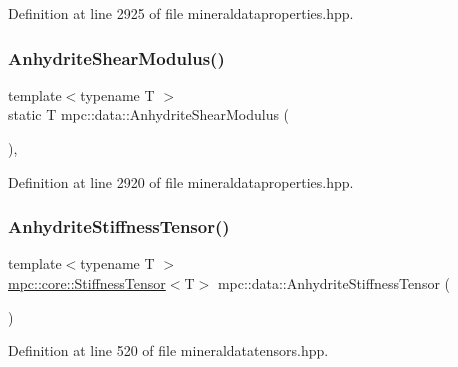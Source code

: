 Definition at line 2925 of file mineraldataproperties.\+hpp.

\mbox{\label{namespacempc_1_1data_a61c625309889da81f4e7cf2fe4afe974}} 
\subsubsection{\texorpdfstring{Anhydrite\+Shear\+Modulus()}{AnhydriteShearModulus()}}
{\footnotesize\ttfamily template$<$typename T $>$ \\
static T mpc\+::data\+::\+Anhydrite\+Shear\+Modulus (\begin{DoxyParamCaption}{ }\end{DoxyParamCaption})\hspace{0.3cm}{\ttfamily [inline]}, {\ttfamily [static]}}



Definition at line 2920 of file mineraldataproperties.\+hpp.

\mbox{\label{namespacempc_1_1data_a68d0dd97f119f5bb16ee4c54d4206491}} 
\subsubsection{\texorpdfstring{Anhydrite\+Stiffness\+Tensor()}{AnhydriteStiffnessTensor()}}
{\footnotesize\ttfamily template$<$typename T $>$ \\
\mbox{\hyperlink{structmpc_1_1core_1_1_stiffness_tensor}{mpc\+::core\+::\+Stiffness\+Tensor}}$<$T$>$ mpc\+::data\+::\+Anhydrite\+Stiffness\+Tensor (\begin{DoxyParamCaption}{ }\end{DoxyParamCaption})}



Definition at line 520 of file mineraldatatensors.\+hpp.

\mbox{\label{namespacempc_1_1data_adc76212838b1323105fb76b188100224}} 
